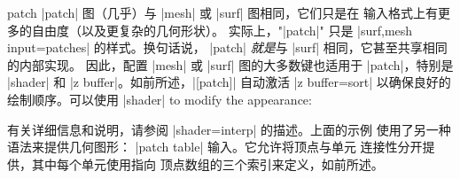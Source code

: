 {\begin{plottype}[/pgfplots]{patch}
        |patch| 图（几乎）与 |mesh| 或 |surf| 图相同，它们只是在
        输入格式上有更多的自由度（以及更复杂的几何形状）。
    实际上，"|patch|" 只是 |surf,mesh input=patches| 的样式。换句话说，
    |patch| \emph{就是}与 |surf| 相同，它甚至共享相同的内部实现。
    因此，配置 |mesh| 或 |surf| 图的大多数键也适用于 |patch|，特别是
    |shader| 和 |z buffer|。如前所述，|[patch]| 自动激活
        |z buffer=sort| 以确保良好的绘制顺序。可以使用 |shader|
    to modify the appearance:
\pgfplotsexpensiveexample
\begin{codeexample}[]
\end{codeexample}

        有关详细信息和说明，请参阅 |shader=interp| 的描述。上面的示例
        使用了另一种语法来提供几何图形：
        |patch table| 输入。它允许将顶点与单元
        连接性分开提供，其中每个单元使用指向
        顶点数组的三个索引来定义，如前所述。

\pgfplotsexpensiveexample
\begin{codeexample}[]
\end{codeexample}


\end{plottype}}
